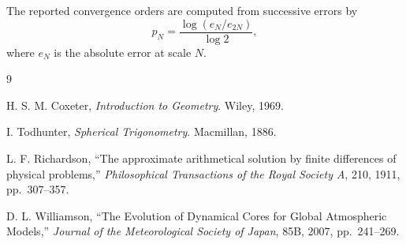 \documentclass[11pt]{article}
\begin{document}
The reported convergence orders are computed from successive errors by
\[
  p_N
  =
  \frac{\log(e_N/e_{2N})}{\log 2},
\]
where $e_N$ is the absolute error at scale $N$.

\begin{thebibliography}{9}

H. S. M. Coxeter,
\emph{Introduction to Geometry}.
Wiley, 1969.

I. Todhunter,
\emph{Spherical Trigonometry}.
Macmillan, 1886.

L. F. Richardson,
``The approximate arithmetical solution by finite differences of physical
problems,''
\emph{Philosophical Transactions of the Royal Society A}, 210, 1911,
pp.\ 307--357.

D. L. Williamson,
``The Evolution of Dynamical Cores for Global Atmospheric Models,''
\emph{Journal of the Meteorological Society of Japan}, 85B, 2007,
pp.\ 241--269.

\end{thebibliography}
\end{document}
